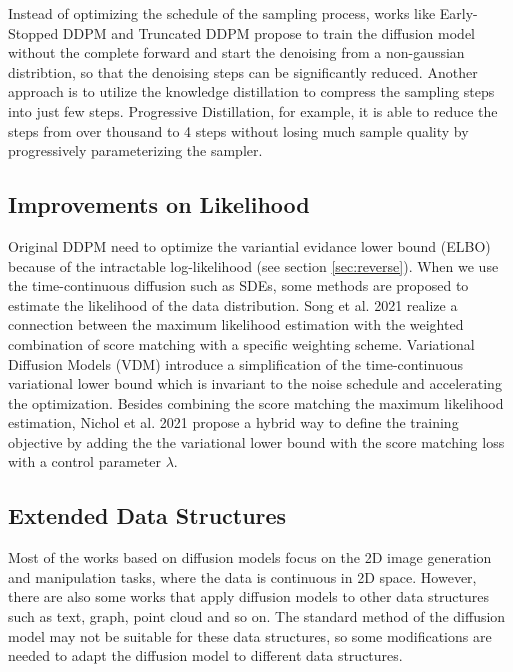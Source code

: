 \documentclass[12pt,DIV14,BCOR12mm,a4paper,footinclude=false,headinclude,parskip=half-,twoside,openright,cleardoublepage=empty,toc=index,bibliography=totoc,listof=totoc]{scrreprt}
\numberwithin{equation}{chapter}
\begin{document}
Instead of optimizing the schedule of the sampling process, works like Early-Stopped DDPM \cite{lyu2022conditional} and Truncated DDPM \cite{zheng2023truncated} propose to train the diffusion model without the complete forward and start the denoising from a non-gaussian distribtion, so that the denoising steps can be significantly reduced. Another approach is to utilize the knowledge distillation \cite{salimans2022progressive,meng2023distillation} to compress the sampling steps into just few steps. Progressive Distillation, for example, it is able to reduce the steps from over thousand to 4 steps without losing much sample quality by progressively parameterizing the sampler.
\subsection{Improvements on Likelihood}
Original DDPM need to optimize the variantial evidance lower bound (ELBO) because of the intractable log-likelihood (see section \ref{sec:reverse}). When we use the time-continuous diffusion such as SDEs, some methods are proposed to estimate the likelihood of the data distribution. Song et al. 2021 \cite{song2021maximum} realize a connection between the maximum likelihood estimation with the weighted combination of score matching with a specific weighting scheme. Variational Diffusion Models (VDM) \cite{kingma2023variational} introduce a simplification of the time-continuous variational lower bound which is invariant to the noise schedule and accelerating the optimization. Besides combining the score matching the maximum likelihood estimation, Nichol et al. 2021 \cite{nichol2021improved} propose a hybrid way to define the training objective by adding the the variational lower bound with the score matching loss with a control parameter $\lambda$.

\subsection{Extended Data Structures}
Most of the works based on diffusion models focus on the 2D image generation and manipulation tasks, where the data is continuous in 2D space. However, there are also some works that apply diffusion models to other data structures such as text, graph, point cloud and so on. The standard method of the diffusion model may not be suitable for these data structures, so some modifications are needed to adapt the diffusion model to different data structures.
\end{document}
